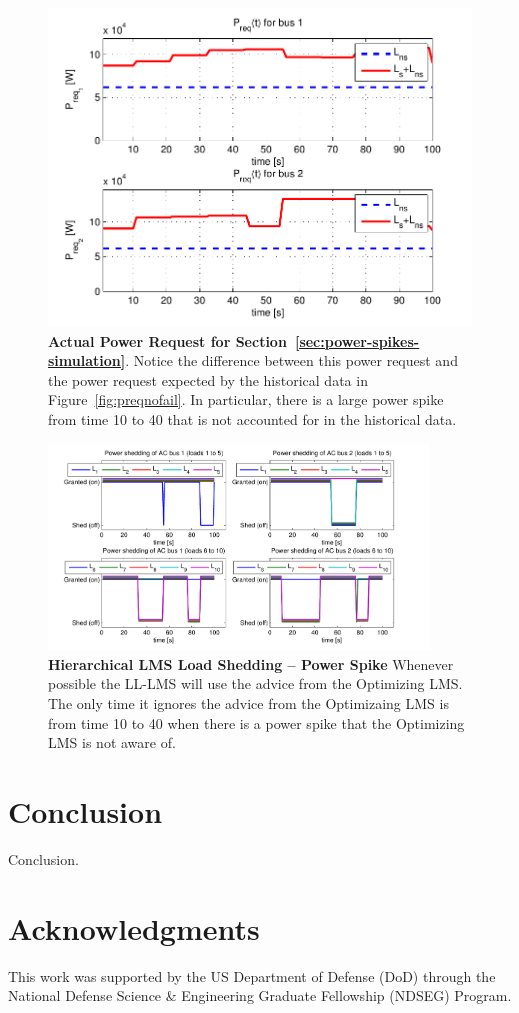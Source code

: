 \documentclass{acm_proc_article-sp}
\begin{document}
\begin{figure}[htb]
  \centering
  \includegraphics[width=0.9\columnwidth]{figures/preqpwrspike}
  \caption{\textbf{Actual Power Request for Section~\ref{sec:power-spikes-simulation}}. Notice the difference between this power
  request and the power request expected by the historical data in 
  Figure~\ref{fig:preqnofail}. In particular, there is a large power spike from time 10
  to 40 that is not accounted for in the historical data.}
  \label{fig:preqpwrspike}
\end{figure}
\begin{figure}[hp]
  \centering
  \includegraphics[width=0.9\textwidth]{figures/lsolpwrspike}
  \caption{\textbf{Hierarchical LMS Load Shedding -- Power Spike} Whenever possible the LL-LMS will
  use the advice from the Optimizing LMS. The only time it ignores the advice from the Optimizaing LMS is
  from time 10 to 40 when there is a power spike that the Optimizing LMS is not aware of.}
  \label{fig:lsolpwrspike}
\end{figure}

\section{Conclusion}
Conclusion.

\section*{Acknowledgments}
This work was supported by the US Department of Defense (DoD) through the National Defense Science \& Engineering Graduate Fellowship (NDSEG) Program.


 
\end{document}
